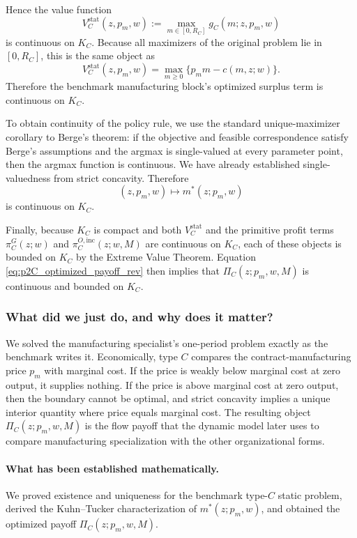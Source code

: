 Hence the value function
\[
V_C^{\mathrm{stat}}(z,p_m,w):=\max_{m\in[0,R_C]} g_C(m;z,p_m,w)
\]
is continuous on $K_C$. Because all maximizers of the original problem lie in $[0,R_C]$, this is the same object as
\[
V_C^{\mathrm{stat}}(z,p_m,w)=\max_{m\ge 0}\{p_m m-c(m,z;w)\}.
\]
Therefore the benchmark manufacturing block's optimized surplus term is continuous on $K_C$.

To obtain continuity of the policy rule, we use the standard unique-maximizer corollary to Berge's theorem: if the objective and feasible correspondence satisfy Berge's assumptions and the argmax is single-valued at every parameter point, then the argmax function is continuous. We have already established single-valuedness from strict concavity. Therefore
\[
(z,p_m,w)\mapsto m^*(z;p_m,w)
\]
is continuous on $K_C$.

Finally, because $K_C$ is compact and both $V_C^{\mathrm{stat}}$ and the primitive profit terms $\pi_C^G(z;w)$ and $\pi_C^{O,\mathrm{inc}}(z;w,M)$ are continuous on $K_C$, each of these objects is bounded on $K_C$ by the Extreme Value Theorem. Equation \eqref{eq:p2C_optimized_payoff_rev} then implies that $\Pi_C(z;p_m,w,M)$ is continuous and bounded on $K_C$.

\subsubsection*{What did we just do, and why does it matter?}
We solved the manufacturing specialist's one-period problem exactly as the benchmark writes it. Economically, type $C$ compares the contract-manufacturing price $p_m$ with marginal cost. If the price is weakly below marginal cost at zero output, it supplies nothing. If the price is above marginal cost at zero output, then the boundary cannot be optimal, and strict concavity implies a unique interior quantity where price equals marginal cost. The resulting object $\Pi_C(z;p_m,w,M)$ is the flow payoff that the dynamic model later uses to compare manufacturing specialization with the other organizational forms.

\paragraph{What has been established mathematically.}
We proved existence and uniqueness for the benchmark type-$C$ static problem, derived the Kuhn--Tucker characterization of $m^*(z;p_m,w)$, and obtained the optimized payoff $\Pi_C(z;p_m,w,M)$.

